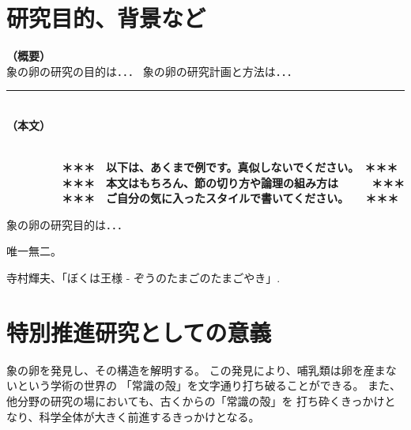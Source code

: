 \documentclass[11pt,a4j,dvipdfmx]{jarticle} 					%
\newcommand{\研究課題名}{象の卵}
\newcommand{\研究機関名}{逢坂大学}
\newcommand{\研究代表者氏名}{湯川秀樹}
\newcommand{\研究期間の最終元号年度}{8}  %
\begin{document}

\section{研究目的、背景など}

\noindent
\mbox{\textbf{（概要）}}\\
	象の卵の研究の目的は．．．	
	象の卵の研究計画と方法は．．．

\noindent
\rule{\linewidth}{1pt}\\
\noindent
\mbox{\textbf{（本文）}}
\JSPSInstructions	%

\textbf{\\　　　　　＊＊＊　以下は、あくまで例です。真似しないでください。　＊＊＊\\
　　　　　＊＊＊　本文はもちろん、節の切り方や論理の組み方は　　　＊＊＊\\
　　　　　＊＊＊　ご自分の気に入ったスタイルで書いてください。　　＊＊＊}

	 象の卵の研究目的は．．．

	唯一無二。




	\vspace{1cm}
	\begin{thebibliography}{99}
		 寺村輝夫、「ぼくは王様 - ぞうのたまごのたまごやき」.
	\end{thebibliography}




\section{特別推進研究としての意義}

	象の卵を発見し、その構造を解明する。
	この発見により、哺乳類は卵を産まないという学術の世界の
	「常識の殻」を文字通り打ち破ることができる。
	また、他分野の研究の場においても、古くからの「常識の殻」を
	打ち砕くきっかけとなり、科学全体が大きく前進するきっかけとなる。
\end{document}

